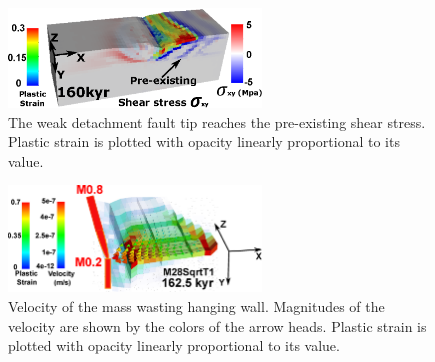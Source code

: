 
\begin{figure}[h]
  \centering
    \includegraphics[width=0.6\textwidth]{./Figures/fig_Results4_5_sqrt_cut_back_pre_accummulated_shear_zone.eps}
  \caption{The weak detachment fault tip reaches the pre-existing shear stress. Plastic strain is plotted with opacity linearly proportional to its value.}
 \label{fig_Results4_5}
\end{figure}   

\begin{figure}[h]
  \centering
    \includegraphics[width=0.6\textwidth]{./Figures/fig_Results_3_2_5_Cut-back_velocity.eps}
  \caption{Velocity of the mass wasting hanging wall. Magnitudes of the velocity are shown by the colors of the arrow heads. Plastic strain is plotted with opacity linearly proportional to its value.}
 \label{fig_Results_3_2_5_Cut-back_velocity}
\end{figure}   

